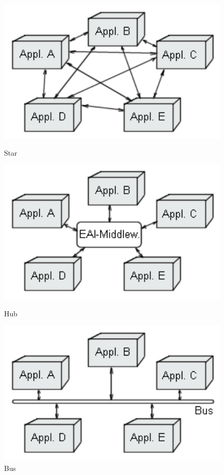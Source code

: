 \documentclass[12pt]{article}
\begin{document}
\begin{figure}
\centering
\begin{minipage}[h]{0.3\textwidth}
\centering
    \includegraphics[width=1.0\textwidth]{images/eai0.png}
    \caption{Star \cite{thorstenhorn}}
    \label{fig:eai0}
\end{minipage}
\begin{minipage}[h]{0.3\textwidth}
\centering
    \includegraphics[width=1.0\textwidth]{images/eai1.png}
    \caption{Hub \cite{thorstenhorn}}
    \label{fig:eai1}
\end{minipage}
\begin{minipage}[h]{0.3\textwidth}
\centering
    \includegraphics[width=1.0\textwidth]{images/eai2.png}
    \caption{Bus \cite{thorstenhorn}}
    \label{fig:eai2}
\end{minipage}
\end{figure}
\end{document}
